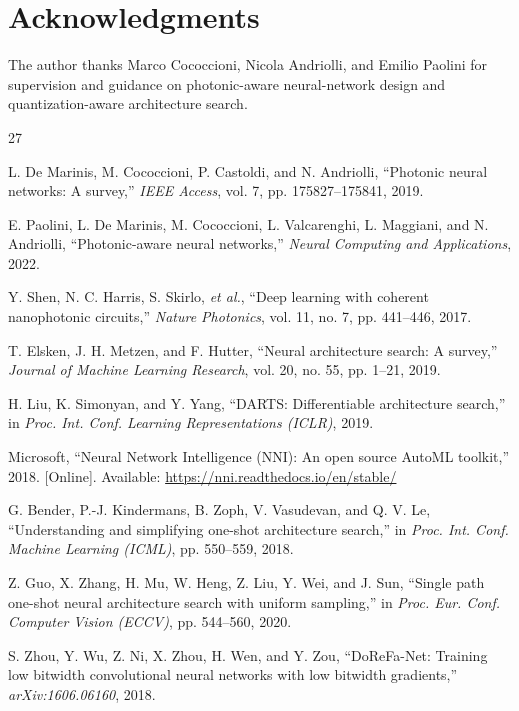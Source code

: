 \documentclass[lettersize,journal]{IEEEtran}
\begin{document}
\section*{Acknowledgments}
The author thanks Marco Cococcioni, Nicola Andriolli, and Emilio Paolini for supervision and guidance on photonic-aware neural-network design and quantization-aware architecture search.

\begin{thebibliography}{27}

L. De Marinis, M. Cococcioni, P. Castoldi, and N. Andriolli, ``Photonic neural networks: A survey,'' \emph{IEEE Access}, vol. 7, pp. 175827--175841, 2019.

E. Paolini, L. De Marinis, M. Cococcioni, L. Valcarenghi, L. Maggiani, and N. Andriolli, ``Photonic-aware neural networks,'' \emph{Neural Computing and Applications}, 2022.

Y. Shen, N. C. Harris, S. Skirlo, \emph{et al.}, ``Deep learning with coherent nanophotonic circuits,'' \emph{Nature Photonics}, vol. 11, no. 7, pp. 441--446, 2017.

T. Elsken, J. H. Metzen, and F. Hutter, ``Neural architecture search: A survey,'' \emph{Journal of Machine Learning Research}, vol. 20, no. 55, pp. 1--21, 2019.

H. Liu, K. Simonyan, and Y. Yang, ``DARTS: Differentiable architecture search,'' in \emph{Proc. Int. Conf. Learning Representations (ICLR)}, 2019.

Microsoft, ``Neural Network Intelligence (NNI): An open source AutoML toolkit,'' 2018. [Online]. Available: \url{https://nni.readthedocs.io/en/stable/}

G. Bender, P.-J. Kindermans, B. Zoph, V. Vasudevan, and Q. V. Le, ``Understanding and simplifying one-shot architecture search,'' in \emph{Proc. Int. Conf. Machine Learning (ICML)}, pp. 550--559, 2018.

Z. Guo, X. Zhang, H. Mu, W. Heng, Z. Liu, Y. Wei, and J. Sun, ``Single path one-shot neural architecture search with uniform sampling,'' in \emph{Proc. Eur. Conf. Computer Vision (ECCV)}, pp. 544--560, 2020.

S. Zhou, Y. Wu, Z. Ni, X. Zhou, H. Wen, and Y. Zou, ``DoReFa-Net: Training low bitwidth convolutional neural networks with low bitwidth gradients,'' \emph{arXiv:1606.06160}, 2018.


\end{thebibliography}
\end{document}
